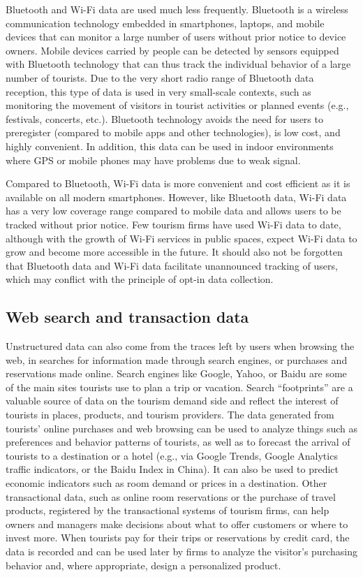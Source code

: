 \documentclass[
  letterpaper,
  DIV=11,
  numbers=noendperiod]{scrreprt}
\begin{document}
Bluetooth and Wi-Fi data are used much less frequently. Bluetooth is a
wireless communication technology embedded in smartphones, laptops, and
mobile devices that can monitor a large number of users without prior
notice to device owners. Mobile devices carried by people can be
detected by sensors equipped with Bluetooth technology that can thus
track the individual behavior of a large number of tourists. Due to the
very short radio range of Bluetooth data reception, this type of data is
used in very small-scale contexts, such as monitoring the movement of
visitors in tourist activities or planned events (e.g., festivals,
concerts, etc.). Bluetooth technology avoids the need for users to
preregister (compared to mobile apps and other technologies), is low
cost, and highly convenient. In addition, this data can be used in
indoor environments where GPS or mobile phones may have problems due to
weak signal.

Compared to Bluetooth, Wi-Fi data is more convenient and cost efficient
as it is available on all modern smartphones. However, like Bluetooth
data, Wi-Fi data has a very low coverage range compared to mobile data
and allows users to be tracked without prior notice. Few tourism firms
have used Wi-Fi data to date, although with the growth of Wi-Fi services
in public spaces, expect Wi-Fi data to grow and become more accessible
in the future. It should also not be forgotten that Bluetooth data and
Wi-Fi data facilitate unannounced tracking of users, which may conflict
with the principle of opt-in data collection.

\hypertarget{web-search-and-transaction-data}{%
\subsection{Web search and transaction
data}\label{web-search-and-transaction-data}}

Unstructured data can also come from the traces left by users when
browsing the web, in searches for information made through search
engines, or purchases and reservations made online. Search engines like
Google, Yahoo, or Baidu are some of the main sites tourists use to plan
a trip or vacation. Search ``footprints'' are a valuable source of data
on the tourism demand side and reflect the interest of tourists in
places, products, and tourism providers. The data generated from
tourists' online purchases and web browsing can be used to analyze
things such as preferences and behavior patterns of tourists, as well as
to forecast the arrival of tourists to a destination or a hotel (e.g.,
via Google Trends, Google Analytics traffic indicators, or the Baidu
Index in China). It can also be used to predict economic indicators such
as room demand or prices in a destination. Other transactional data,
such as online room reservations or the purchase of travel products,
registered by the transactional systems of tourism firms, can help
owners and managers make decisions about what to offer customers or
where to invest more. When tourists pay for their trips or reservations
by credit card, the data is recorded and can be used later by firms to
analyze the visitor's purchasing behavior and, where appropriate, design
a personalized product.
\end{document}
